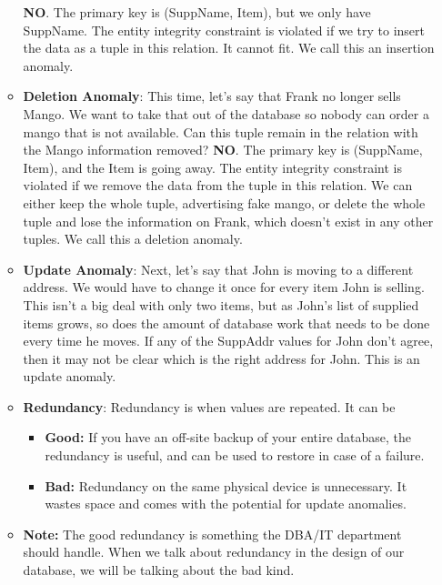 \documentclass{report}
\begin{document}
\begin{itemize}
\begin{itemize}
                    \bigbreak \noindent 
                    \textbf{NO}. The primary key is (SuppName, Item), but we only have SuppName. The entity integrity constraint is violated if we try to insert the data as a tuple in this relation. It cannot fit. We call this an insertion anomaly.
                \item \textbf{Deletion Anomaly}: This time, let’s say that Frank no longer sells Mango. We want to take that out of the database so nobody can order a mango that is not available. Can this tuple remain in the relation with the Mango information removed?
                    \bigbreak \noindent 
                    \textbf{NO}. The primary key is (SuppName, Item), and the Item is going away. The entity integrity constraint is violated if we remove the data from the tuple in this relation. We can either keep the whole tuple, advertising fake mango, or delete the whole tuple and lose the information on Frank, which doesn’t exist in any other tuples. We call this a deletion anomaly.
                \item \textbf{Update Anomaly}: Next, let’s say that John is moving to a different address. We would have to change it once for every item John is selling. This isn’t a big deal with only two items, but as John’s list of supplied items grows, so does the amount of database work that needs to be done every time he moves. If any of the SuppAddr values for John don’t agree, then it may not be clear which is the right address for John. This is an update anomaly.
                \item \textbf{Redundancy}: Redundancy is when values are repeated.
                    \bigbreak \noindent 
                    It can be
                    \begin{itemize}
                        \item \textbf{Good:} If you have an off-site backup of your entire database, the redundancy is useful, and can be used to restore in case of a failure.
                        \item \textbf{Bad:} Redundancy on the same physical device is unnecessary. It wastes space and comes with the potential for update anomalies.
                    \end{itemize}
                \item \textbf{Note:} The good redundancy is something the DBA/IT department should handle. When we talk about redundancy in the design of our database, we will be talking about the bad kind.
            \end{itemize}

\end{itemize}
\end{document}
